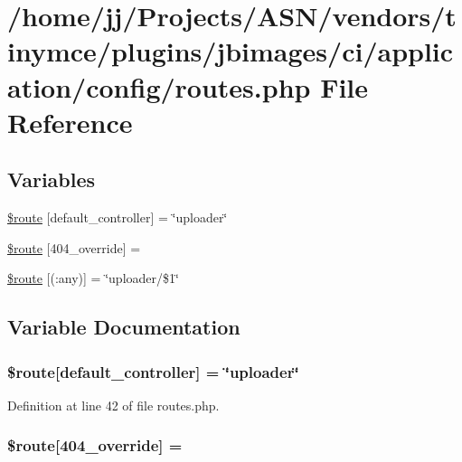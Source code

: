 \hypertarget{routes_8php}{}\section{/home/jj/\+Projects/\+A\+S\+N/vendors/tinymce/plugins/jbimages/ci/application/config/routes.php File Reference}
\label{routes_8php}
\subsection*{Variables}
\begin{DoxyCompactItemize}
\item 
\hyperlink{routes_8php_a6c2a82e4cec825eb1921141d08af834b}{\$route} \mbox{[}\textquotesingle{}default\+\_\+controller\textquotesingle{}\mbox{]} = \char`\"{}uploader\char`\"{}
\item 
\hyperlink{routes_8php_ad99ba8a90b758dbe982c621c9f27eedc}{\$route} \mbox{[}\textquotesingle{}404\+\_\+override\textquotesingle{}\mbox{]} = \textquotesingle{}\textquotesingle{}
\item 
\hyperlink{routes_8php_a4f4a60643ecf039e359f845247f5124d}{\$route} \mbox{[}\textquotesingle{}(\+:any)\textquotesingle{}\mbox{]} = \char`\"{}uploader/\$1\char`\"{}
\end{DoxyCompactItemize}


\subsection{Variable Documentation}
\subsubsection[{\texorpdfstring{\$route}{$route}}]{\setlength{\rightskip}{0pt plus 5cm}\$route\mbox{[}\textquotesingle{}default\+\_\+controller\textquotesingle{}\mbox{]} = \char`\"{}uploader\char`\"{}}\hypertarget{routes_8php_a6c2a82e4cec825eb1921141d08af834b}{}\label{routes_8php_a6c2a82e4cec825eb1921141d08af834b}


Definition at line 42 of file routes.\+php.

\subsubsection[{\texorpdfstring{\$route}{$route}}]{\setlength{\rightskip}{0pt plus 5cm}\$route\mbox{[}\textquotesingle{}404\+\_\+override\textquotesingle{}\mbox{]} = \textquotesingle{}\textquotesingle{}}\hypertarget{routes_8php_ad99ba8a90b758dbe982c621c9f27eedc}{}\label{routes_8php_ad99ba8a90b758dbe982c621c9f27eedc}



